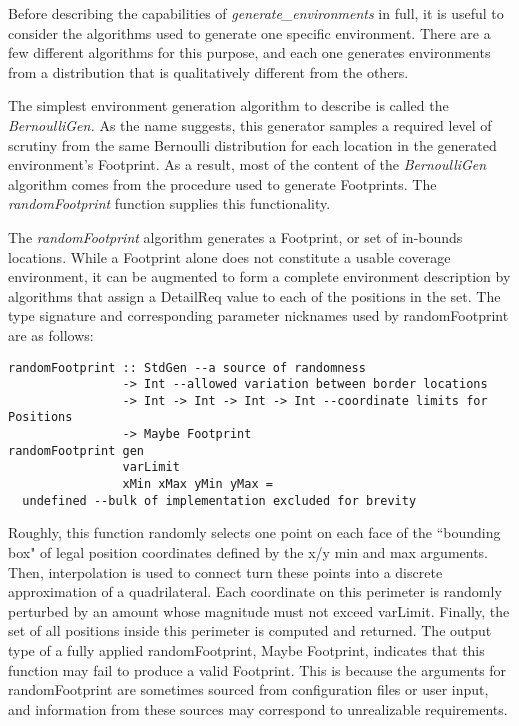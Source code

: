 Before describing the capabilities of \textit{generate\_environments} in full, it is useful to consider the algorithms used to generate one specific environment. There are a few different algorithms for this purpose, and each one generates environments from a distribution that is qualitatively different from the others.

The simplest environment generation algorithm to describe is called the \textit{BernoulliGen.} As the name suggests, this generator samples a required level of scrutiny from the same Bernoulli distribution for each location in the generated environment's Footprint. As a result, most of the content of the \textit{BernoulliGen} algorithm comes from the procedure used to generate Footprints. The \textit{randomFootprint} function supplies this functionality.

The \textit{randomFootprint} algorithm generates a Footprint, or set of in-bounds locations. While a Footprint alone does not constitute a usable coverage environment, it can be augmented to form a complete environment description by algorithms that assign a DetailReq value to each of the positions in the set. The type signature and corresponding parameter nicknames used by randomFootprint are as follows:

\begin{verbatim}
randomFootprint :: StdGen --a source of randomness
                -> Int --allowed variation between border locations
                -> Int -> Int -> Int -> Int --coordinate limits for Positions
                -> Maybe Footprint
randomFootprint gen 
                varLimit 
                xMin xMax yMin yMax =
  undefined --bulk of implementation excluded for brevity
\end{verbatim}

Roughly, this function randomly selects one point on each face of the ``bounding box" of legal position coordinates defined by the x/y min and max arguments. Then, interpolation is used to connect turn these points into a discrete approximation of a quadrilateral. Each coordinate on this perimeter is randomly perturbed by an amount whose magnitude must not exceed varLimit. Finally, the set of all positions inside this perimeter is computed and returned. The output type of a fully applied randomFootprint, Maybe Footprint, indicates that this function may fail to produce a valid Footprint. This is because the arguments for randomFootprint are sometimes sourced from configuration files or user input, and information from these sources may correspond to unrealizable requirements.

